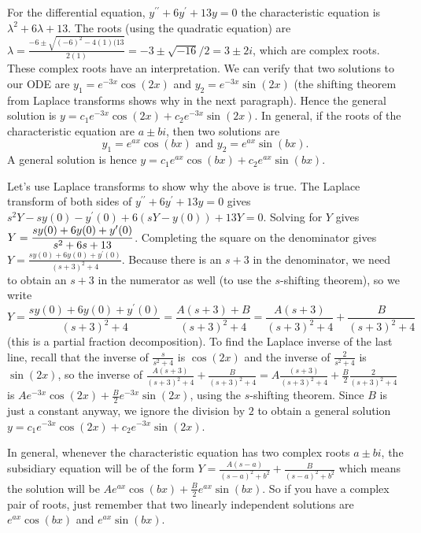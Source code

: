 \begin{example}
For the differential equation, $y^{\prime\prime}+6y^\prime+13y=0$ the characteristic equation is $\lambda^2+6\lambda+13$. The roots (using the quadratic equation) are $\lambda=\frac{-6\pm\sqrt{(-6)^2-4(1)(13}}{2(1)} = -3\pm\sqrt{-16}/2 = 3\pm 2i$, which are complex roots.  
These complex roots have an interpretation. We can verify that two solutions to our ODE are $y_1= e^{-3x}\cos(2x)$ and $y_2= e^{-3x}\sin(2x)$ (the shifting theorem from Laplace transforms shows why in the next paragraph). 
Hence the general solution is $y=c_1e^{-3x}\cos(2x)+c_2e^{-3x}\sin(2x)$.  
In general, if the roots of the characteristic equation are $a\pm b i$, then two solutions are 
$$y_1= e^{a x}\cos(b x)\text{ and } y_2= e^{a x}\sin(b x).$$ A general solution is hence $y=c_1e^{ax}\cos(bx)+c_2e^{ax}\sin(bx)$.

Let's use Laplace transforms to show why the above is true. The Laplace transform of both sides of $y^{\prime\prime}+6y^\prime+13y=0$ gives $s^2Y-sy(0)-y^\prime(0) + 6(sY-y(0)) +13Y=0$. Solving for $Y$ gives
$Y = \displaystyle\frac{sy(0)+6y(0)+y^\prime(0)}{s^2+6s+13}$. Completing the square on the denominator gives $Y = \frac{sy(0)+6y(0)+y^\prime(0)}{(s+3)^2+4}$. Because there is an $s+3$ in the denominator, we need to obtain an $s+3$ in the numerator as well (to use the $s$-shifting theorem), so we write 
$$Y=\frac{s y(0)+6y(0)+y^\prime(0)}{(s+3)^2+4} =\frac{A(s+3)+B}{(s+3)^2+4} = \frac{A(s+3)}{(s+3)^2+4} +\frac{B}{(s+3)^2+4}$$ (this is a partial fraction decomposition). To find the Laplace inverse of the last line, recall that the inverse of $\frac{s}{s^2+4}$ is $\cos(2x)$ and the inverse of $\frac{2}{s^2+4}$ is $\sin(2x)$, so the inverse of  $\frac{A(s+3)}{(s+3)^2+4} +\frac{B}{(s+3)^2+4} =  A\frac{(s+3)}{(s+3)^2+4} +\frac{B}{2}\frac{2}{(s+3)^2+4}$ is $Ae^{-3x}\cos(2x)+\frac{B}{2}e^{-3x}\sin(2x)$, using the $s$-shifting theorem. Since $B$ is just a constant anyway, we ignore the division by $2$ to obtain a general solution $y=c_1e^{-3x}\cos(2x)+c_2e^{-3x}\sin(2x)$.   
\end{example}

In general, whenever the characteristic equation has two complex roots $a\pm bi$, the subsidiary equation will be of the form $Y=\frac{A(s-a)}{(s-a)^2+b^2} +\frac{B}{(s-a)^2+b^2}$ which means the solution will be $Ae^{ax}\cos(bx)+\frac{B}{2}e^{ax}\sin(bx)$. So if you have a complex pair of roots, just remember that two linearly independent solutions are $e^{ax}\cos(bx)$ and $e^{ax}\sin(bx)$.  
 
